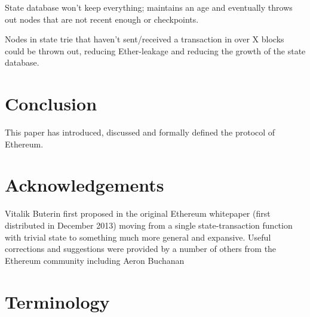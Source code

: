 \documentclass[9pt,oneside]{amsart}
\begin{document}
\begin{multicols}{2}
State database won't keep everything; maintains an age and eventually throws out nodes that are not recent enough or checkpoints.

Nodes in state trie that haven't sent/received a transaction in over X blocks could be thrown out, reducing Ether-leakage and reducing the growth of the state database.

\section{Conclusion} \label{ch:conclusion}

This paper has introduced, discussed and formally defined the protocol of Ethereum.

\section{Acknowledgements}

Vitalik Buterin first proposed in the original Ethereum whitepaper (first distributed in December 2013) moving from a single state-transaction function with trivial state to something much more general and expansive. Useful corrections and suggestions were provided by a number of others from the Ethereum community including Aeron Buchanan




\end{multicols}

\appendix

\section{Terminology}
\end{document}
